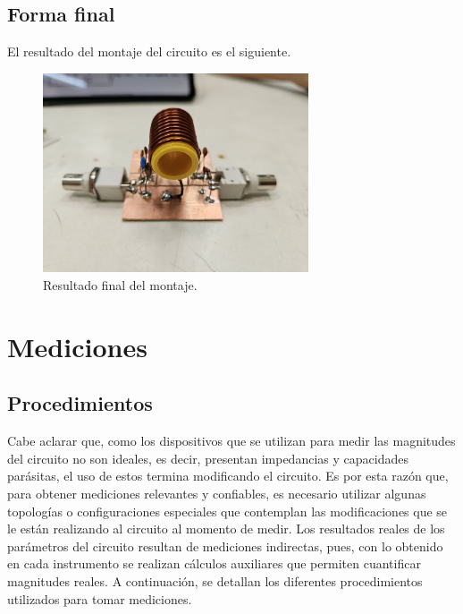 \documentclass{article}
\begin{document}
\subsection{Forma final}
El resultado del montaje del circuito es el siguiente.
\begin{figure}[H]
\centering
\includegraphics[width=0.7\textwidth]{./img/figura21.jpg}
\caption{Resultado final del montaje.}
\label{fig:circuito21}
\end{figure}
\newpage
\section{Mediciones}
\subsection{Procedimientos}
Cabe aclarar que, como los dispositivos que se utilizan para medir las magnitudes del circuito no son ideales, es decir, presentan impedancias y capacidades parásitas, el uso de estos termina modificando el circuito. Es por esta razón que, para obtener mediciones relevantes y confiables, es necesario utilizar algunas topologías o configuraciones especiales que contemplan las modificaciones que se le están realizando al circuito al momento de medir. Los resultados reales de los parámetros del circuito resultan de mediciones indirectas, pues, con lo obtenido en cada instrumento se realizan cálculos auxiliares que permiten cuantificar magnitudes reales. A continuación, se detallan los diferentes procedimientos utilizados para tomar mediciones.
\end{document}
